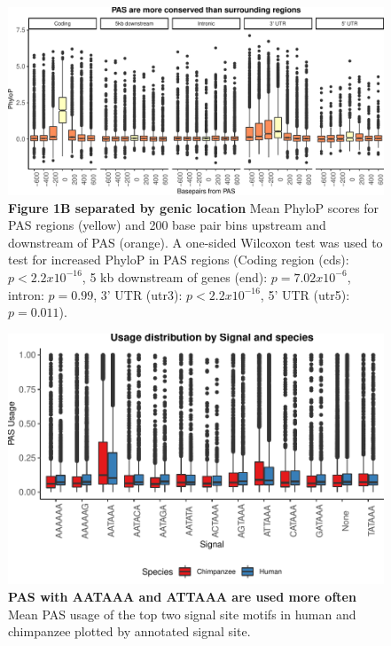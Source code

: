 \begin{figure}[!htb]
\centering
\includegraphics[width=5in]{img/ch03/Fig1-figSup7.pdf}
\caption[Figure 1B separated by genic location]{\textbf{Figure 1B separated by genic location} Mean PhyloP scores for PAS regions (yellow) and 200 base pair bins upstream and downstream of PAS (orange). A one-sided Wilcoxon test was used to test for increased PhyloP in PAS regions  (Coding region (cds): $p < 2.2x10^{-16}$, 5 kb downstream of genes (end): $p = 7.02x10^{-6}$, intron: $p=0.99$, 3' UTR (utr3): $p < 2.2x10^{-16}$, 5' UTR (utr5): $p = 0.011$).}
\label{fig:ch03-phylopLoc}
\end{figure}
\clearpage

\begin{figure}[!htb]
\centering
\includegraphics[width=5in]{img/ch03/Fig1-figSup8.pdf}
\caption[PAS with AATAAA and ATTAAA are used more often]{\textbf{PAS with AATAAA and ATTAAA are used more often} Mean PAS usage of the top two signal site motifs in human and chimpanzee plotted by annotated signal site.}
\label{fig:ch03-SignalUsage}
\end{figure}
\clearpage

